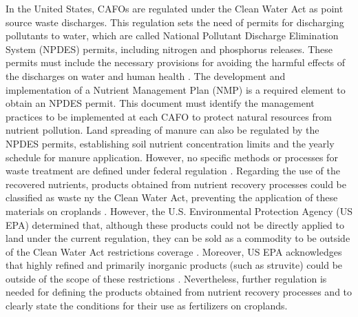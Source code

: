 \begin{refsection}[referencesCh1]
In the United States, CAFOs are regulated under the Clean Water Act as point source waste discharges. This regulation sets the need of permits for discharging pollutants to water, which are called National Pollutant Discharge Elimination System (NPDES) permits, including nitrogen and phosphorus releases. These permits must include the necessary provisions for avoiding the harmful effects of the discharges on water and human health \citep{NPDE_basics}. The development and implementation of a Nutrient Management Plan (NMP) is a required element to obtain an NPDES permit. This document must identify the management practices to be implemented at each CAFO to protect natural resources from nutrient pollution. Land spreading of manure can also be regulated by the NPDES permits, establishing soil nutrient concentration limits and the yearly schedule for manure application. However, no specific methods or processes for waste treatment are defined under federal regulation \citep{NPDESforCAFO}. Regarding the use of the recovered nutrients, products obtained from nutrient recovery processes could be classified as waste ny the Clean Water Act, preventing the application of these materials on croplands \citep{NACWA503}. However, the U.S. Environmental Protection Agency (US EPA) determined that, although these products could not be directly applied to land under the current regulation, they can be sold as a commodity to be outside of the Clean Water Act restrictions coverage \citep{CNP503}. Moreover, US EPA acknowledges that highly refined and primarily inorganic products (such as struvite) could be outside of the scope of these restrictions \citep{CNP503}. Nevertheless, further regulation is needed for defining the products obtained from nutrient recovery processes and to clearly state the conditions for their use as fertilizers on croplands.


\end{refsection}
